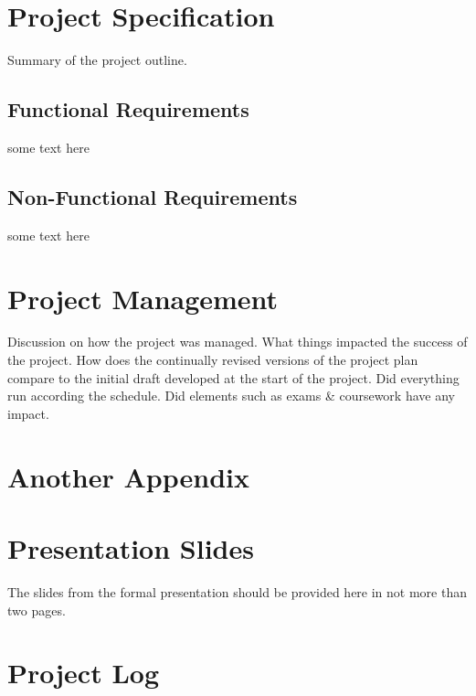 \chapter{Project Specification}
Summary of the project outline.

\section{Functional Requirements}
some text here

\section{Non-Functional Requirements}
some text here

\chapter{Project Management}
Discussion on how the project was managed. What things impacted the success of the project. How does the continually revised versions of the project plan compare to the initial draft developed at the start of the project. Did everything run according the schedule. Did elements such as exams \& coursework have any impact. 

\chapter{Another Appendix}



\chapter{Presentation Slides}

The slides from the formal presentation should be provided here in not more than two pages. 

\chapter{Project Log}







